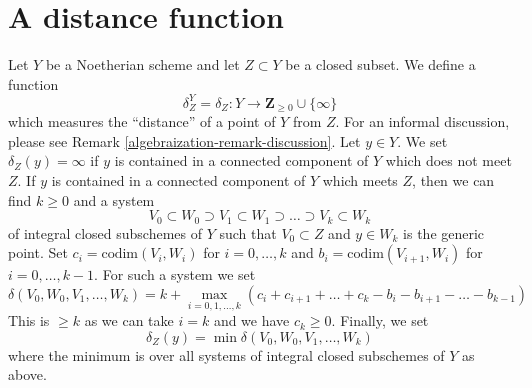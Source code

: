 \section{A distance function}
\label{algebraization-section-distance}
Let $Y$ be a Noetherian scheme and let $Z \subset Y$ be a closed subset.
We define a function
\begin{equation}
\label{equation-delta-Z}
\delta^Y_Z = \delta_Z : Y \longrightarrow \mathbf{Z}_{\geq 0} \cup \{\infty\}
\end{equation}
which measures the ``distance'' of a point of $Y$ from $Z$.
For an informal discussion, please see Remark \ref{algebraization-remark-discussion}.
Let $y \in Y$. We set $\delta_Z(y) = \infty$ if $y$ is contained
in a connected component of $Y$ which does not meet $Z$.
If $y$ is contained in a connected component of $Y$ which meets $Z$,
then we can find $k \geq 0$ and a system
$$
V_0 \subset W_0 \supset V_1 \subset W_1 \supset \ldots \supset
V_k \subset W_k
$$
of integral closed subschemes of $Y$ such that $V_0 \subset Z$
and $y \in W_k$ is the generic point. Set
$c_i = \text{codim}(V_i, W_i)$ for $i = 0, \ldots, k$
and $b_i = \text{codim}(V_{i + 1}, W_i)$ for $i = 0, \ldots, k - 1$.
For such a system we set
$$
\delta(V_0, W_0, V_1, \ldots, W_k) =
k +
\max_{i = 0, 1, \ldots, k}
(c_i + c_{i + 1} + \ldots + c_k - b_i - b_{i + 1} - \ldots - b_{k - 1})
$$
This is $\geq k$ as we can take $i = k$ and we have $c_k \geq 0$.
Finally, we set
$$
\delta_Z(y) = \min \delta(V_0, W_0, V_1, \ldots, W_k)
$$
where the minimum is over all systems of integral closed subschemes of $Y$
as above.

